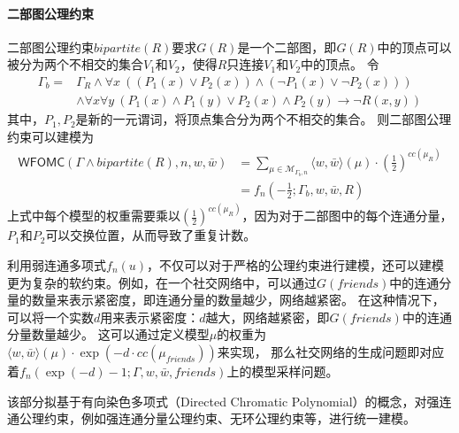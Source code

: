 \documentclass[12pt,UTF8,AutoFakeBold=3,a4paper]{ctexart} %
\newcommand{\sentence}{\Gamma}
\newcommand{\weight}{w}
\newcommand{\negweight}{\bar{w}}
\newcommand{\symwfomc}{\ensuremath{\mathsf{WFOMC}}}
\newcommand{\fomodels}[2]{\mathcal{M}_{#1, #2}}
\newcommand{\typeweight}[1]{\langle \weight, \negweight\rangle(#1)}
\newcommand{\symsentence}{\sentence_R}
\begin{document}
\paragraph{二部图公理约束}
二部图公理约束$bipartite(R)$要求$G(R)$是一个二部图，即$G(R)$中的顶点可以被分为两个不相交的集合$V_1$和$V_2$，使得$R$只连接$V_1$和$V_2$中的顶点。
令
\begin{align*}
  \sentence_b = &\symsentence \land \forall x \ ((P_1(x) \lor P_2(x)) \land (\lnot P_1(x) \lor \lnot P_2(x))) \\
    &\land \forall x \forall y \ \left( P_1(x) \land P_1(y) \lor P_2(x) \land P_2(y) \to \lnot R(x,y) \right)
\end{align*}
其中，$P_1, P_2$是新的一元谓词，将顶点集合分为两个不相交的集合。
则二部图公理约束可以建模为
\begin{align*}
  \symwfomc(\sentence \land bipartite(R), n, \weight, \negweight) &= \sum_{\mu\in\fomodels{\sentence_b}{n}} \typeweight{\mu}\cdot (\frac{1}{2})^{cc(\mu_R)} \\
  &= f_n(-\frac 12; \sentence_b, \weight, \negweight, R)
\end{align*}
上式中每个模型的权重需要乘以$(\frac{1}{2})^{cc(\mu_R)}$，因为对于二部图中的每个连通分量，$P_1$和$P_2$可以交换位置，从而导致了重复计数。

利用弱连通多项式$f_n(u)$，不仅可以对于严格的公理约束进行建模，还可以建模更为复杂的软约束。例如，在一个社交网络中，可以通过$G(friends)$中的连通分量的数量来表示紧密度，即连通分量的数量越少，网络越紧密。
在这种情况下，可以将一个实数$d$用来表示紧密度：$d$越大，网络越紧密，即$G(friends)$中的连通分量数量越少。
这可以通过定义模型$\mu$的权重为$\typeweight{\mu}\cdot \exp(-d\cdot cc(\mu_{friends}))$来实现，
那么社交网络的生成问题即对应着$f_n(\exp(-d) - 1; \sentence, \weight, \negweight, friends)$上的模型采样问题。


该部分拟基于有向染色多项式（Directed Chromatic Polynomial）的概念，对强连通公理约束，例如强连通分量公理约束、无环公理约束等，进行统一建模。
\end{document}
